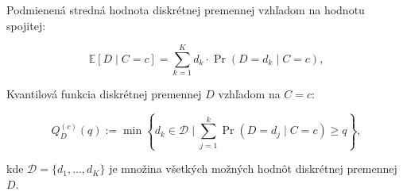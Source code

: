 Podmienená stredná hodnota diskrétnej premennej vzhľadom na hodnotu spojitej:

\begin{equation} 
\mathbb{E}[D \mid C = c] = \sum_{k = 1}^{K} d_k \cdot \Pr(D = d_k \mid C = c), \end{equation}

Kvantilová funkcia diskrétnej premennej $D$ vzhľadom na $C = c$:

\begin{equation} 
Q_D^{(c)}(q) := \min \left\{ d_k \in \mathcal{D} \mid \sum_{j=1}^{k} \Pr(D = d_j \mid C = c) \geq q \right\}, 
\end{equation}

kde $\mathcal{D} = \{ d_1, \ldots, d_K \}$ je množina všetkých možných hodnôt diskrétnej premennej $D$.
